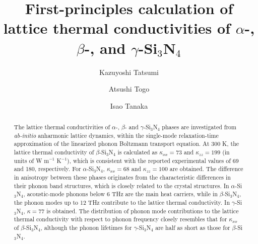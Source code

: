 \documentclass[twocolumn,amsmath,amssymb,a4paper,prb,superscriptaddress,floatfix]{revtex4-1}
\begin{document}
\title{First-principles calculation of lattice thermal
conductivities of $\alpha$-, $\beta$-, and $\gamma$-Si$_3$N$_4$}

\author{Kazuyoshi Tatsumi} 

\author{Atsushi Togo}

\author{Isao Tanaka}

\begin{abstract}
The lattice thermal conductivities of $\alpha$-, $\beta$- and $\gamma$-Si$_3$N$_4$
phases are investigated from {\it ab-initio} anharmonic lattice dynamics, within
the single-mode relaxation-time approximation of the linearized phonon Boltzmann
transport equation. At 300 K, the lattice thermal conductivity of
$\beta$-Si$_3$N$_4$ is calculated as $\kappa_{xx}=73$ and $\kappa_{zz}=199$ (in
units of W m$^{-1}$ K$^{-1}$), which is consistent with the reported experimental
values of 69 and 180, respectively. For $\alpha$-Si$_3$N$_4$, $\kappa_{xx}=68$
and $\kappa_{zz}=100$ are obtained.  The difference in anisotropy between these
phases originates from the characteristic differences in their phonon band
structures, which is closely related to the crystal structures.  In $\alpha$-Si$_3$N$_4$,
acoustic-mode phonons below 6 THz are the main heat carriers, while in
$\beta$-Si$_3$N$_4$, the phonon modes up to 12 THz contribute to the lattice
thermal conductivity. In $\gamma$-Si$_3$N$_4$, $\kappa=77$ is obtained. The
distribution of phonon mode contributions to the lattice thermal conductivity with
respect to phonon frequency closely resembles that for $\kappa_{xx}$
of $\beta$-Si$_3$N$_4$, although the phonon lifetimes for $\gamma$-Si$_3$N$_4$ are
half as short as those for $\beta$-Si$_3$N$_4$.
\end{abstract}

\maketitle
\end{document}
